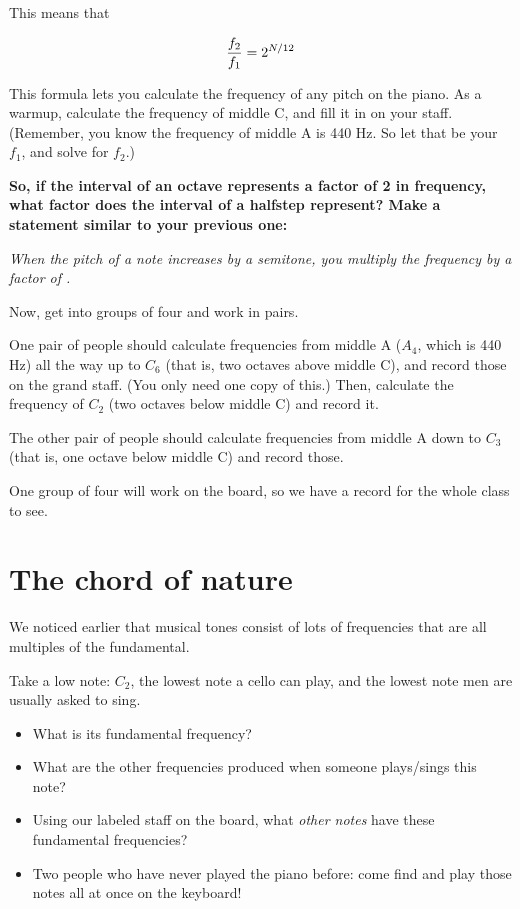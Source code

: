 \documentclass[10pt]{article}
\begin{document}
This means that

$$
\large \frac{f_2}{f_1} = 2^{N/12}
$$

This formula lets you calculate the frequency of any pitch on the piano. As a warmup, calculate the frequency of middle C, and fill it in on your staff.
(Remember, you know the frequency of middle A is 440 Hz. So let that be your $f_1$, and solve for $f_2$.)

\vspace{1in}

\bf So, if the interval of an octave represents a factor of 2 in frequency, what factor does the interval of a halfstep represent? Make a statement 
similar to your previous one:

\it When the pitch of a note increases by a semitone, you multiply the frequency by a factor of \underline{\hspace{1in}}.
\rm
\vspace{1in}

Now, get into groups of four and work in pairs.

One pair of people should calculate frequencies from middle A ($A_4$, which is 440 Hz) all the way up to $C_6$ (that is, two octaves
above middle C), and record those on the grand staff. (You only need one copy of this.) Then, calculate the frequency of $C_2$ (two octaves
below middle C) and record it.

The other pair of people should calculate frequencies from middle A down to $C_3$ (that is, one octave below middle C) and record those.

One group of four will work on the board, so we have a record for the whole class to see.

\newpage

\section{The chord of nature}

We noticed earlier that musical tones consist of lots of frequencies that are all multiples of the fundamental.

Take a low note: $C_2$, the lowest note a cello can play, and the lowest note men are usually asked to sing. 

\begin{itemize}
  \item What is its fundamental frequency?

  \item What are the other frequencies produced when someone plays/sings this note?

  \item Using our labeled staff on the board, what {\it other notes} have these fundamental frequencies?

  \item Two people who have never played the piano before: come find and play those notes all at once on the keyboard!
\end{itemize}
\end{document}
